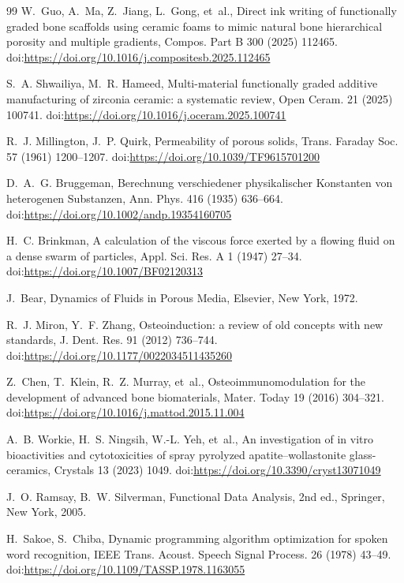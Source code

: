 \documentclass[11pt]{article}
\begin{document}
\begin{thebibliography}{99}
W.~Guo, A.~Ma, Z.~Jiang, L.~Gong, et~al., Direct ink writing of functionally graded bone scaffolds using ceramic foams to mimic natural bone hierarchical porosity and multiple gradients, Compos. Part B 300 (2025) 112465.
\newblock doi:\url{https://doi.org/10.1016/j.compositesb.2025.112465}


S.~A. Shwailiya, M.~R. Hameed, Multi-material functionally graded additive manufacturing of zirconia ceramic: a systematic review, Open Ceram. 21 (2025) 100741.
\newblock doi:\url{https://doi.org/10.1016/j.oceram.2025.100741}


R.~J. Millington, J.~P. Quirk, Permeability of porous solids, Trans. Faraday Soc. 57 (1961) 1200--1207.
\newblock doi:\url{https://doi.org/10.1039/TF9615701200}


D.~A.~G. Bruggeman, Berechnung verschiedener physikalischer Konstanten von heterogenen Substanzen, Ann. Phys. 416 (1935) 636--664.
\newblock doi:\url{https://doi.org/10.1002/andp.19354160705}


H.~C. Brinkman, A calculation of the viscous force exerted by a flowing fluid on a dense swarm of particles, Appl. Sci. Res. A 1 (1947) 27--34.
\newblock doi:\url{https://doi.org/10.1007/BF02120313}


J.~Bear, Dynamics of Fluids in Porous Media, Elsevier, New York, 1972.


R.~J. Miron, Y.~F. Zhang, Osteoinduction: a review of old concepts with new standards, J. Dent. Res. 91 (2012) 736--744.
\newblock doi:\url{https://doi.org/10.1177/0022034511435260}


Z.~Chen, T.~Klein, R.~Z. Murray, et~al., Osteoimmunomodulation for the development of advanced bone biomaterials, Mater. Today 19 (2016) 304--321.
\newblock doi:\url{https://doi.org/10.1016/j.mattod.2015.11.004}


A.~B. Workie, H.~S. Ningsih, W.-L. Yeh, et~al., An investigation of in vitro bioactivities and cytotoxicities of spray pyrolyzed apatite--wollastonite glass-ceramics, Crystals 13 (2023) 1049.
\newblock doi:\url{https://doi.org/10.3390/cryst13071049}


J.~O. Ramsay, B.~W. Silverman, Functional Data Analysis, 2nd ed., Springer, New York, 2005.


H.~Sakoe, S.~Chiba, Dynamic programming algorithm optimization for spoken word recognition, IEEE Trans. Acoust. Speech Signal Process. 26 (1978) 43--49.
\newblock doi:\url{https://doi.org/10.1109/TASSP.1978.1163055}



\end{thebibliography}
\end{document}
